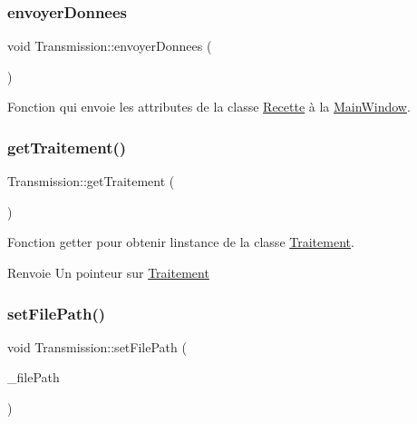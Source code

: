 \subsubsection{\texorpdfstring{envoyer\+Donnees}{envoyerDonnees}}
{\footnotesize\ttfamily void Transmission\+::envoyer\+Donnees (\begin{DoxyParamCaption}{ }\end{DoxyParamCaption})\hspace{0.3cm}{\ttfamily [slot]}}



Fonction qui envoie les attributes de la classe \hyperlink{classRecette}{Recette} à la \hyperlink{classMainWindow}{Main\+Window}. 

\mbox{\label{classTransmission_ae7c158b2d20256c381d7e0bb8552f154}} 
\subsubsection{\texorpdfstring{get\+Traitement()}{getTraitement()}}
{\footnotesize\ttfamily Transmission\+::get\+Traitement (\begin{DoxyParamCaption}{ }\end{DoxyParamCaption})\hspace{0.3cm}{\ttfamily [inline]}}



Fonction getter pour obtenir l\textquotesingle{}instance de la classe \hyperlink{classTraitement}{Traitement}. 

\begin{DoxyReturn}{Renvoie}
Un pointeur sur \hyperlink{classTraitement}{Traitement} 
\end{DoxyReturn}
\mbox{\label{classTransmission_a5099a8d2ae60a2f159230bf81bafebdc}} 
\subsubsection{\texorpdfstring{set\+File\+Path()}{setFilePath()}}
{\footnotesize\ttfamily void Transmission\+::set\+File\+Path (\begin{DoxyParamCaption}\item[{Q\+String}]{\+\_\+file\+Path }\end{DoxyParamCaption})\hspace{0.3cm}{\ttfamily [inline]}}



